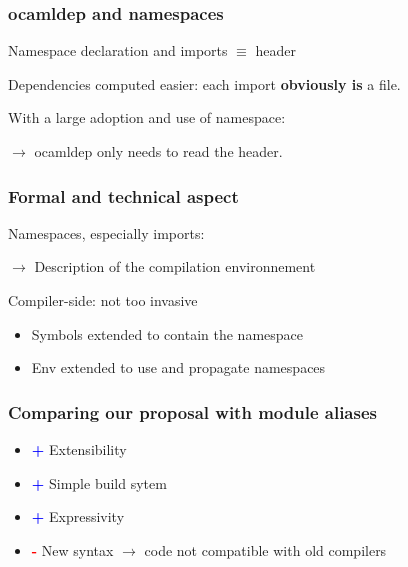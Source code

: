 \documentclass{beamer}
\begin{document}
\begin{frame}
\frametitle{ocamldep and namespaces}

Namespace declaration and imports $\equiv$ header

\bigskip

Dependencies computed easier: each import \textbf{obviously is} a file.

\bigskip

With a large adoption and use of namespace: 

$\rightarrow$ ocamldep only needs to read the header.

\end{frame}

\begin{frame}
\frametitle{Formal and technical aspect}

Namespaces, especially imports:

 $\rightarrow$ Description of the compilation environnement

\bigskip

Compiler-side: not too invasive
\begin{itemize}[<+->]
\item Symbols extended to contain the namespace
\item Env extended to use and propagate namespaces
\end{itemize}

\end{frame}

\begin{frame}
\frametitle{Comparing our proposal with module aliases}
\begin{itemize}[<+->]
\item \textcolor{blue}{\textbf{+}} Extensibility
\item \textcolor{blue}{\textbf{+}} Simple build sytem
\item \textcolor{blue}{\textbf{+}} Expressivity
\item \textcolor{red}{\textbf{-}} New syntax $\rightarrow$ code not compatible with old compilers
\end{itemize}
\end{frame}
\end{document}
